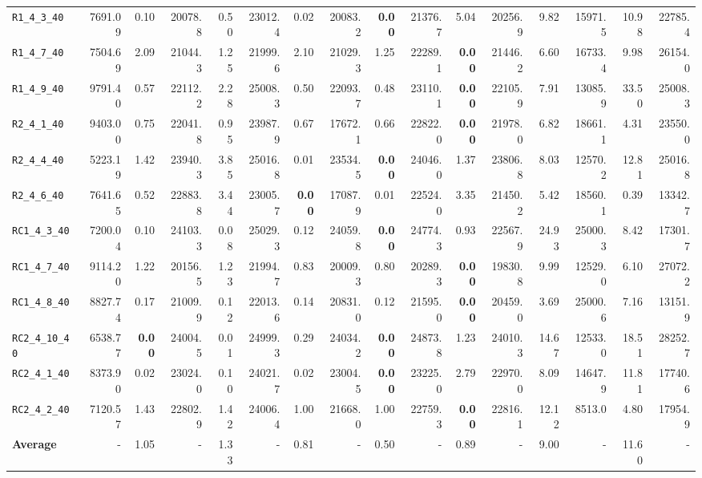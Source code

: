 \begin{table}[ht]
\begin{adjustbox}{width=\textwidth}
\begin{tabular}{l r r r @{\hspace{8pt}} r r @{\hspace{8pt}} r r @{\hspace{8pt}} r r @{\hspace{8pt}} r r @{\hspace{8pt}} r r @{\hspace{8pt}} r r @{\hspace{8pt}}}
\texttt{R1\_4\_3\_40} & 7691.09 & 0.10 & 20078.8 & 0.50 & 23012.4 & 0.02 & 20083.2 & \textbf{0.00} & 21376.7 & 5.04 & 20256.9 & 9.82 & 15971.5 & 10.98 & 22785.4 \\
\texttt{R1\_4\_7\_40} & 7504.69 & 2.09 & 21044.3 & 1.25 & 21999.6 & 2.10 & 21029.3 & 1.25 & 22289.1 & \textbf{0.00} & 21446.2 & 6.60 & 16733.4 & 9.98 & 26154.0 \\
\texttt{R1\_4\_9\_40} & 9791.40 & 0.57 & 22112.2 & 2.28 & 25008.3 & 0.50 & 22093.7 & 0.48 & 23110.1 & \textbf{0.00} & 22105.9 & 7.91 & 13085.9 & 33.50 & 25008.3 \\
\texttt{R2\_4\_1\_40} & 9403.00 & 0.75 & 22041.8 & 0.95 & 23987.9 & 0.67 & 17672.1 & 0.66 & 22822.0 & \textbf{0.00} & 21978.0 & 6.82 & 18661.1 & 4.31 & 23550.0 \\
\texttt{R2\_4\_4\_40} & 5223.19 & 1.42 & 23940.3 & 3.85 & 25016.8 & 0.01 & 23534.5 & \textbf{0.00} & 24046.0 & 1.37 & 23806.8 & 8.03 & 12570.2 & 12.81 & 25016.8 \\
\texttt{R2\_4\_6\_40} & 7641.65 & 0.52 & 22883.8 & 3.44 & 23005.7 & \textbf{0.00} & 17087.9 & 0.01 & 22524.0 & 3.35 & 21450.2 & 5.42 & 18560.1 & 0.39 & 13342.7 \\
\texttt{RC1\_4\_3\_40} & 7200.04 & 0.10 & 24103.3 & 0.08 & 25029.3 & 0.12 & 24059.8 & \textbf{0.00} & 24774.3 & 0.93 & 22567.9 & 24.93 & 25000.3 & 8.42 & 17301.7 \\
\texttt{RC1\_4\_7\_40} & 9114.20 & 1.22 & 20156.5 & 1.23 & 21994.7 & 0.83 & 20009.3 & 0.80 & 20289.3 & \textbf{0.00} & 19830.8 & 9.99 & 12529.0 & 6.10 & 27072.2 \\
\texttt{RC1\_4\_8\_40} & 8827.74 & 0.17 & 21009.9 & 0.12 & 22013.6 & 0.14 & 20831.0 & 0.12 & 21595.0 & \textbf{0.00} & 20459.0 & 3.69 & 25000.6 & 7.16 & 13151.9 \\
\texttt{RC2\_4\_10\_40} & 6538.77 & \textbf{0.00} & 24004.5 & 0.01 & 24999.3 & 0.29 & 24034.2 & \textbf{0.00} & 24873.8 & 1.23 & 24010.3 & 14.67 & 12533.0 & 18.51 & 28252.7 \\
\texttt{RC2\_4\_1\_40} & 8373.90 & 0.02 & 23024.0 & 0.10 & 24021.7 & 0.02 & 23004.5 & \textbf{0.00} & 23225.0 & 2.79 & 22970.0 & 8.09 & 14647.9 & 11.81 & 17740.6 \\
\texttt{RC2\_4\_2\_40} & 7120.57 & 1.43 & 22802.9 & 1.42 & 24006.4 & 1.00 & 21668.0 & 1.00 & 22759.3 & \textbf{0.00} & 22816.1 & 12.12 & 8513.0 & 4.80 & 17954.9 \\
\midrule
\textbf{Average} & - & 1.05 & - & 1.33 & - & 0.81 & - & 0.50 & - & 0.89 & - & 9.00 & - & 11.60 & - \\
\bottomrule
\end{tabular}
\end{adjustbox}
\end{table}